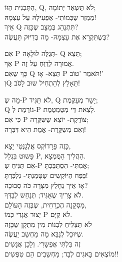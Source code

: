 הַתָּכְנִית הַזּוֹ, Q, לֹא תֻּשְאַר יְתוֹמָה;\\
מַמְזֵר שֶכְּמוֹתִי- אַפְעִילָהּ עַל עַצְמָהּ!\\
אֵיךְ Q תִּתְנַהֵג בְּמַצָּב שֶכָּזֶה?\\
כְּשֶתִּקְרָא אֶת עַצְמָהּ- מָה בְּדִיּוּק תַּעֲשֶׂה?\\
\leavevmode
\newline

אִם P תְּגַלֶּה לוּלָאָה- Q תֵּצֵא;\\
אַךְ P אֲמוּרָה לְדַוֵּחַ עַל זֶה.\\
כָּךְ שֶאִם Q תֵּצֵא- אָז P תֹּאמַר 'טוֹב!'\\
וְQ תֵּאָלֵץ לְהַתְחִיל שוּב לָסֹב!\\
\leavevmode
\newline

מָה שֶ-P לֹא תַּגִּיד, Q יָשָר מְעַקֶּמֶת;\\

Q גוֹרֶמֶת לְ-P לָצֵאת דֵּי מְטֻמְטֶמֶת.\\
כִּי אִם P צוֹדֶקֶת- יוֹצֵא שֶשִּקְּרָה;\\
וְאִם מְשַקֶּרֶת- אֱמֶת הִיא דִּבְּרָה!\\
\leavevmode
\newline

כָּזֶה פָּרָדוֹקְס אֱלֶגָנְטִי יָצָא,\\
פָּשוּט בִּגְלַל P, הַהֲלִיך הַמֻּמְצָא.\\
אִם תַּנִּיחַ שֶ-P אֲמִתִּי- הִסְתַּבַּכְתָּ;\\
בְּפַח הַיּוֹקְשִים שֶטָּמַנְתִּי- נִלְכַּדְתָּ!\\
\leavevmode
\newline
אָז אֵיך נֵחָלֵץ מִצָּרָה כֹּה סְבוּכָה?\\
לֹא צָרִיךְ שֶאַגִּיד; תְּנַחֵש לְבַדְּךָ.\\
מַסְקָנָה הֶכְרֵחִית, שֶבְּזֶה הָעוֹלָם,\\
יְצוּר אֲגָדִי כְּמוֹ P לֹא קַיָּם.\\
\leavevmode
\newline
לֹא תַּצְלִיחַ לִבְנוֹת מִין מִתְקָן שֶכָּזֶה\\
שֶיּוּכַל לְנַבֵּא מָה מַחְשֵב יַעֲשֶׂה.\\
זֶה בִּלְתִּי אֶפְשָרִי. וְלָכֵן אֲנָשִים\\
מוֹצְאִים בָּאגִים לְבַד; מַחְשֵבִים הֵם טִפְּשִים!!\\
\leavevmode
\newline
